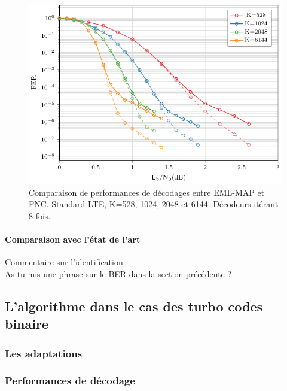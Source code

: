 \begin{figure}[!htb]
	\centering
	\includegraphics[width=\textwidth]{main/ch3_fig/fnc/lte/tikz/lte.pdf}
	\caption{Comparaison de performances de décodages entre EML-MAP et FNC. Standard LTE, K=528, 1024, 2048 et 6144.
	Décodeurs itérant 8 fois. \label{fig:fnc_lte}}
\end{figure}


\paragraph{Comparaison avec l'état de l'art}
Commentaire sur l'identification\\
As tu mis une phrase sur le BER dans la section précédente ?

\subsection{L'algorithme dans le cas des turbo codes binaire}

\subsubsection{Les adaptations}

\subsubsection{Performances de décodage}




